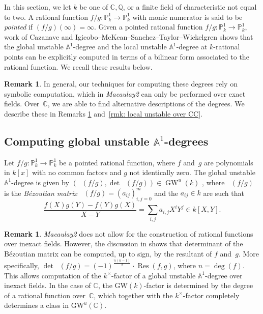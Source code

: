 \documentclass[12pt]{amsart}
\theoremstyle{definition}
\newtheorem{remark}[theorem]{Remark}
\DeclareMathOperator{\Bez}{B\acute{e}z}
\DeclareMathOperator{\GW}{GW}
\DeclareMathOperator{\Res}{Res}
\begin{document}
In this section, we let $k$ be one of $\mathbb{C},\mathbb{Q}$, or a finite field of characteristic not equal to two. A rational function $f/g\colon\mathbb{P}^{1}_{k}\to\mathbb{P}^{1}_{k}$ with monic numerator is said to be \emph{pointed} if $(f/g)(\infty)=\infty$. Given a pointed rational function $f/g\colon\mathbb{P}^{1}_{k}\to\mathbb{P}^{1}_{k}$, work of Cazanave \cite[Theorem~3.6]{Cazanave} and Igieobo--McKean--Sanchez--Taylor--Wickelgren \cite[Lemma~3.10]{IMSTW} shows that the global unstable $\mathbb{A}^{1}$-degree and the local unstable $\mathbb{A}^{1}$-degree at $k$-rational points can be explicitly computed in terms of a bilinear form associated to the rational function. We recall these results below.

\begin{remark}\label{rmk: over CC intro}
In general, our techniques for computing these degrees rely on symbolic computation, which in \emph{Macaulay2} can only be performed over exact fields. Over~$\mathbb{C}$, we are able to find alternative descriptions of the degrees. We describe these in Remarks \ref{rmk: global unstable over CC} and~\ref{rmk: local unstable over CC}. 
\end{remark}

\subsection{Computing global unstable \texorpdfstring{$\mathbb{A}^{1}$}{A\textonesuperior}-degrees}\label{subsec: unstable global degrees} 
Let $f/g\colon\mathbb{P}^{1}_{k}\to\mathbb{P}^{1}_{k}$ be a pointed rational function, where $f$ and~$g$ are polynomials in $k[x]$ with no common factors and $g$ not identically zero. The global unstable $\mathbb{A}^{1}$-degree is given by $(\Bez(f/g),\det\Bez(f/g))\in\GW^{u}(k)$ \cite[Theorem~3.6]{Cazanave}, where $\Bez(f/g)$ is the \emph{B\'{e}zoutian matrix} $\Bez(f/g)=(a_{ij})_{i,j=0}^{m}$ and the $a_{ij}\in k$ are such that 
\[\frac{f(X)g(Y)-f(Y)g(X)}{X-Y}=\sum_{i,j}a_{i,j}X^{i}Y^{j}\in k[X,Y].\]

\begin{remark}\label{rmk: global unstable over CC}
\emph{Macaulay2} does not allow for the construction of rational functions over inexact fields. However, the discussion in \cite[\S~3.2]{Cazanave} shows that determinant of the B\'{e}zoutian matrix can be computed, up to sign, by the resultant of $f$ and~$g$. More specifically, $\det\Bez(f/g)=(-1)^{\frac{n(n-1)}{2}}\cdot\Res(f,g)$, where $n = \deg(f)$. This allows computation of the $k^{\times}$-factor of a global unstable $\mathbb{A}^{1}$-degree over inexact fields. In the case of $\mathbb{C}$, the $\text{GW}(k)$-factor is determined by the degree of a rational function over~$\mathbb{C}$, which together with the $k^{\times}$-factor completely determines a class in $\text{GW}^{u}(\mathbb{C})$. 
\end{remark}
\end{document}
